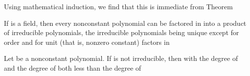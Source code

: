 \documentclass[11pt,oneside]{article}
\begin{document}
\begin{BookBody}
 Using mathematical induction, we find that this is immediate from Theorem \BookEnd{\blacklozenge}

 If  is a field, then every nonconstant polynomial  can be factored in  into a product of irreducible polynomials, the irreducible polynomials being unique except for order and for unit (that is, nonzero constant) factors in 

 Let  be a nonconstant polynomial. If  is not irreducible, then   with the degree of  and the degree of  both less than the degree of 

\end{BookBody}

\BookNarrativetrue
\end{document}
